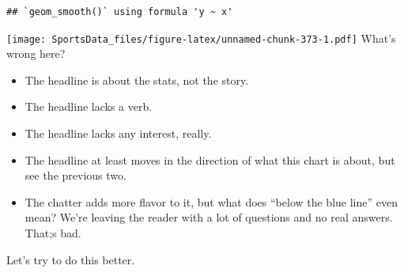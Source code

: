\documentclass[
]{book}
\providecommand{\tightlist}{%
  \setlength{\itemsep}{0pt}\setlength{\parskip}{0pt}}
\begin{document}
\begin{verbatim}
## `geom_smooth()` using formula 'y ~ x'
\end{verbatim}

\texttt{[image: SportsData\_files/figure-latex/unnamed-chunk-373-1.pdf]}
What's wrong here?

\begin{itemize}
\tightlist
\item
  The headline is about the stats, not the story.
\item
  The headline lacks a verb.
\item
  The headline lacks any interest, really.
\item
  The headline at least moves in the direction of what this chart is about, but see the previous two.
\item
  The chatter adds more flavor to it, but what does ``below the blue line'' even mean? We're leaving the reader with a lot of questions and no real answers. That;s bad.
\end{itemize}

Let's try to do this better.
\end{document}
